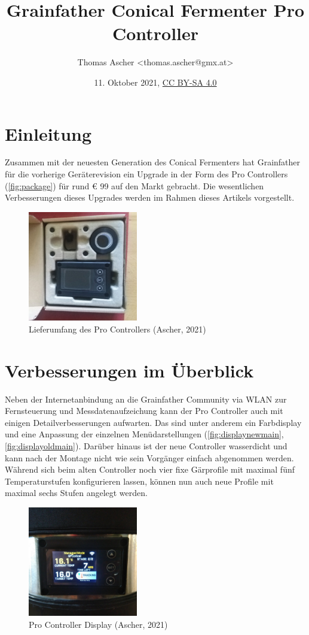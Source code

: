 \documentclass[a4paper,parskip=half]{scrartcl}
\title{Grainfather Conical Fermenter Pro Controller}
\author{Thomas Ascher <thomas.ascher@gmx.at>}
\date{11. Oktober 2021, \href{http://creativecommons.org/licenses/by-sa/4.0/}{CC BY-SA 4.0}}
\begin{document}
\maketitle

\section*{Einleitung}

Zusammen mit der neuesten Generation des Conical Fermenters
hat Grainfather für die vorherige Geräterevision ein Upgrade
in der Form des Pro Controllers (\autoref{fig:package}) für
rund € 99 auf den Markt gebracht.
Die wesentlichen Verbesserungen dieses Upgrades werden im Rahmen
dieses Artikels vorgestellt. 
 
\begin{figure}[h]
\centering
\includegraphics[width=4.8cm]{images/gfpc_package.jpg}
\caption{Lieferumfang des Pro Controllers (Ascher, 2021)}
\label{fig:package}
\end{figure}

\section*{Verbesserungen im Überblick}

Neben der Internetanbindung an die Grainfather Community
via WLAN zur Fernsteuerung und Messdatenaufzeichung kann der
Pro Controller auch mit einigen Detailverbesserungen aufwarten.
Das sind unter anderem ein Farbdisplay und eine Anpassung
der einzelnen Menüdarstellungen (\autoref{fig:displaynewmain},
\autoref{fig:displayoldmain}). Darüber hinaus ist der neue
Controller wasserdicht und kann nach der Montage nicht
wie sein Vorgänger einfach abgenommen werden.
Während sich beim alten Controller noch vier fixe Gärprofile mit
maximal fünf Temperaturstufen konfigurieren lassen, können nun
auch neue Profile mit maximal sechs Stufen angelegt werden.

\begin{figure}[H]
\centering
\includegraphics[width=4.8cm]{images/gfpc_display_new_main.jpg}
\caption{Pro Controller Display (Ascher, 2021)}
\label{fig:displaynewmain}
\end{figure}
\end{document}
